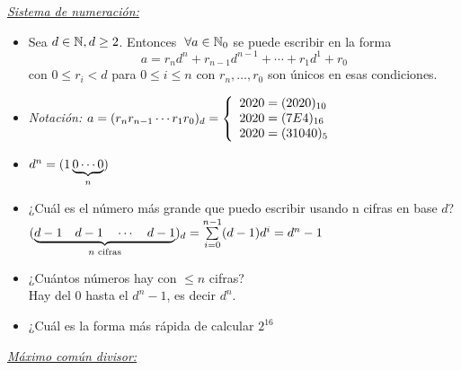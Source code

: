 \textit{\underline{Sistema de numeración: }}
\begin{itemize}
	\item Sea $d \en \naturales, d \geq 2$. Entonces $\paratodo a \en \naturales_0$ se puede
	      escribir en la forma
	      \[
		      a = r_n d^n + r_{n-1} d^{n-1} + \cdots + r_1 d^1 + r_0
	      \]
	      con $0 \leq r_i < d$ para $0 \leq i \leq n$ con $r_n,\dots, r_0$ son únicos
	      en esas condiciones.

	\item \textit{Notación:} $a = (r_n r_{n-1}\cdots r_1 r_0)_d =
		      \llave{l}{
			      2020 = (2020)_{10} \\
			      2020 = (7E4)_{16} \\
			      2020 = (31040)_{5}
		      }$
	\item $d^n = (1 \ub{0\cdots 0}{n})$

	\item ¿Cuál es el número más grande que puedo escribir usando n cifras en base $d$?\\
	      $(\ub{d-1\quad d-1\quad \cdots\quad d-1}{n \text{ cifras}})_d =  \sumatoria{i=0}{n-1}(d-1)d^i = d^n -1$

	\item ¿Cuántos números hay con $\leq n$ cifras?\\
	      Hay del $0$ hasta el $d^n -1$, es decir $d^n$.

	\item ¿Cuál es la forma más rápida de calcular $2^{16}$

\end{itemize}
\textit{\underline{Máximo común divisor: }}
\def\mcd{(a:b)}
\def\D{\mathcal D}
\def\cz{s\cdot a + t \cdot b}
